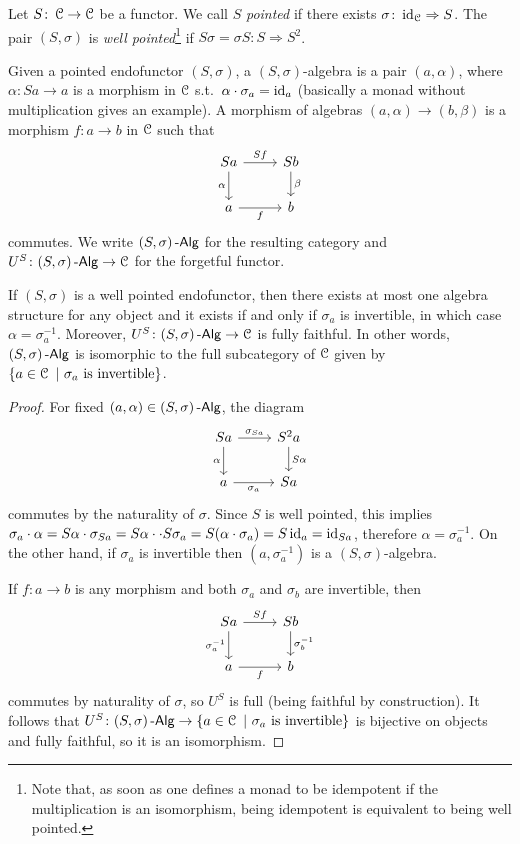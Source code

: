 \documentclass[a4paper,11pt,oneside,openany]{scrbook}
\begin{document}
\begin{defn}
	Let $S\colon\operatorname{\mathcal{C}}\to\operatorname{\mathcal{C}}$ be a functor. We call $S$ \emph{pointed} if there exists $\sigma\colon\operatorname{id}_{\operatorname{\mathcal{C}}}\Rightarrow S$. The pair $(S,\sigma)$ is \emph{well pointed}\footnote{Note that, as soon as one defines a monad to be idempotent if the multiplication is an isomorphism, being idempotent is equivalent to being well pointed.} if $S\sigma=\sigma S\colon S\Rightarrow S^2$.
\end{defn}
\begin{defn}
	Given a pointed endofunctor $(S,\sigma)$, a $(S,\sigma)$-algebra is a pair
    $(a,\alpha)$, where $\alpha\colon Sa\to a$ is a morphism in $\operatorname{\mathcal{C}}$ s.t.\
    $\alpha\cdot\sigma_a=\operatorname{id}_a$ (basically a monad without multiplication gives
    an example). A morphism of algebras $(a,\alpha)\to(b,\beta)$ is a morphism
    $f\colon a\to b$ in $\operatorname{\mathcal{C}}$ such that
	\[
		\begin{tikzcd}
			Sa\arrow["\alpha"']{d}\arrow["Sf"]{r}
			& Sb\arrow["\beta"]{d} \\
			a\arrow["f"']{r}
			& b
		\end{tikzcd}
	\]
	commutes. We write $(S,\sigma)\operatorname{-\mathsf{Alg}}$ for the resulting category and $U^S\colon(S,\sigma)\operatorname{-\mathsf{Alg}}\to\operatorname{\mathcal{C}}$ for the forgetful functor.
\end{defn}
\begin{lemma}
	If $(S,\sigma)$ is a well pointed endofunctor, then there exists at most one algebra structure for any object and it exists if and only if $\sigma_a$ is invertible, in which case $\alpha=\sigma_a^{-1}$. Moreover, $U^S\colon(S,\sigma)\operatorname{-\mathsf{Alg}}\to\operatorname{\mathcal{C}}$ is fully faithful. In other words, $(S,\sigma)\operatorname{-\mathsf{Alg}}$ is isomorphic to the full subcategory of $\operatorname{\mathcal{C}}$ given by $\{a\in\operatorname{\mathcal{C}}\ |\ \sigma_a \ \text{is invertible} \}$.
\end{lemma}
\begin{proof}
	For fixed $(a,\alpha)\in(S,\sigma)\operatorname{-\mathsf{Alg}}$, the diagram
	\[
		\begin{tikzcd}
			Sa\arrow["\alpha"']{d}\arrow["\sigma_{Sa}"]{r}
			& S^2a\arrow["S\alpha"]{d} \\
			a\arrow["\sigma_a"']{r}
			& Sa
		\end{tikzcd}
	\]
	commutes by the naturality of $\sigma$. Since $S$ is well pointed, this
    implies $\sigma_a\cdot\alpha=S\alpha\cdot\sigma_{Sa}=S\alpha\cdot
    \cdot S\sigma_a=S(\alpha\cdot\sigma_a)=S\operatorname{id}_a=\operatorname{id}_{Sa}$, therefore
    $\alpha=\sigma_a^{-1}$. On the other hand, if $\sigma_a$ is invertible then
    $(a,\sigma_a^{-1})$ is a $(S,\sigma)$-algebra.

	If $f\colon a\to b$ is any morphism and both $\sigma_a$ and $\sigma_b$ are invertible, then
	\[
		\begin{tikzcd}
			Sa\arrow["\sigma_a^{-1}"']{d}\arrow["Sf"]{r}
			& Sb\arrow["\sigma_b^{-1}"]{d} \\
			a\arrow["f"']{r}
			& b
		\end{tikzcd}
	\]
	commutes by naturality of $\sigma$, so $U^S$ is full (being faithful by construction). It follows that $U^S\colon(S,\sigma)\Alg\to\{a\in\C\ |\ \sigma_a \ \text{is invertible}\}$ is bijective on objects and fully faithful, so it is an isomorphism.
\end{proof}
\end{document}
